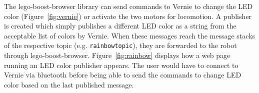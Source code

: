         The \textsf{lego-boost-browser} library can send commands to Vernie to change the \ac{LED} color (Figure~\ref{fig:vernie}) or activate the two motors for locomotion. A publisher is created which simply publishes a different \ac{LED} color as a string from the acceptable list of colors by Vernie. When these messages reach the message stacks of the respective topic (e.g. \texttt{rainbow\smallunderscore  topic}), they are forwarded to the robot through \textsf{lego-boost-browser}. Figure~\ref{fig:rainbow} displays how a web page running an \ac{LED} color publisher appears. The user would have to connect to Vernie via bluetooth before being able to send the commands to change \ac{LED} color based on the last published message. 

        \begin{figure}[htbp]
            \centering
            \vspace{2em}

            \vspace{1em}
            

\end{figure}
